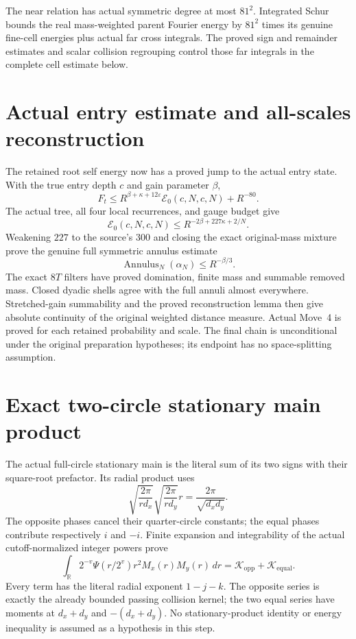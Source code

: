 \documentclass[11pt]{article}
\begin{document}
The near relation has actual symmetric degree at most $81^2$. Integrated
Schur bounds the real mass-weighted parent Fourier energy by $81^2$ times
its genuine fine-cell energies plus actual far cross integrals. The proved
sign and remainder estimates and scalar collision regrouping control those
far integrals in the complete cell estimate below.

\newpage
\section*{Actual entry estimate and all-scales reconstruction}
The retained root self energy now has a proved jump to the actual entry
state. With the true entry depth $c$ and gain parameter $\beta$,
\[
F_t\le R^{\beta+\kappa+12\varepsilon}
\mathcal E_0(c,N,c,N)+R^{-80}.
\]
The actual tree, all four local recurrences, and gauge budget give
\[
\mathcal E_0(c,N,c,N)\le R^{-2\beta+227\kappa+2/N}.
\]
Weakening $227$ to the source's $300$ and closing the exact original-mass
mixture prove the genuine full symmetric annulus estimate
\[
\operatorname{Annulus}_N(\alpha_N)\le R^{-\beta/3}.
\]
The exact $8T$ filters have proved domination, finite mass and summable
removed mass. Closed dyadic shells agree with the full annuli almost
everywhere. Stretched-gain summability and the proved reconstruction lemma
then give absolute continuity of the original weighted distance measure.
Actual Move~4 is proved for each retained probability and scale. The final
chain is unconditional under the original preparation hypotheses; its
endpoint has no space-splitting assumption.

\newpage
\section*{Exact two-circle stationary main product}
The actual full-circle stationary main is the literal sum of its two signs
with their square-root prefactor. Its radial product uses
\[
\sqrt{\frac{2\pi}{rd_x}}\sqrt{\frac{2\pi}{rd_y}}r
=\frac{2\pi}{\sqrt{d_xd_y}}.
\]
The opposite phases cancel their quarter-circle constants; the equal phases
contribute respectively $i$ and $-i$. Finite expansion and integrability of
the actual cutoff-normalized integer powers prove
\[
\int_{\mathbb R}2^{-v}\Psi(r/2^v)r^2 M_x(r)M_y(r)\,dr
=\mathcal K_{\mathrm{opp}}+\mathcal K_{\mathrm{equal}}.
\]
Every term has the literal radial exponent $1-j-k$. The opposite series is
exactly the already bounded passing collision kernel; the two equal series
have moments at $d_x+d_y$ and $-(d_x+d_y)$. No stationary-product identity or
energy inequality is assumed as a hypothesis in this step.
\end{document}
